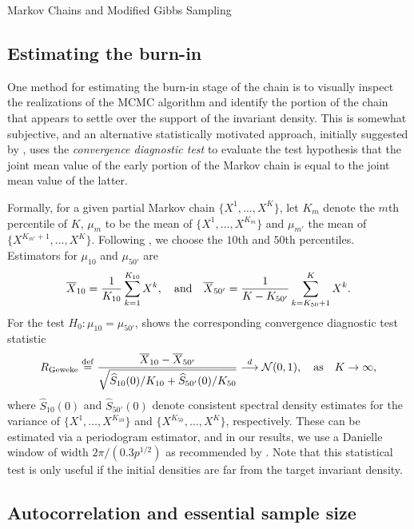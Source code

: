 \begin{chapter}{Markov Chains and Modified Gibbs Sampling}
\subsection{Estimating the burn-in}

One method for estimating the burn-in stage of the chain is to visually inspect the realizations of the MCMC algorithm and identify the portion of the chain that appears to settle over the support of the invariant density.
This is somewhat subjective, and an alternative statistically motivated approach, initially suggested by \citep{geweke1991evaluating}, uses the \emph{convergence diagnostic test} to evaluate the test hypothesis that the joint mean value of the early portion of the Markov chain is equal to the joint mean value of the latter. 

Formally, for a given partial Markov chain $\{X^1,\dots, X^K\}$, let $K_m$ denote the $m$th percentile of $K$, $\mu_m$ to be the mean of $\{X^1,\dots, X^{K_m}\}$ and $\mu_{m'}$ the mean of $\{X^{K_{m'}+1},\dots, X^K\}$.
Following \citep{geweke1991evaluating}, we choose the $10$th and $50$th percentiles.
Estimators for $\mu_{10}$ and $\mu_{50'}$ are
\begin{equation}
  \bar X_{10}=\frac{1}{K_{10}}\sum_{k=1}^{K_{10}}X^k,\quad{\rm and}\quad\bar X_{50'}=\frac{1}{K-K_{50'}}\sum_{k=K_{50}+1}^K X^k.
\end{equation}
For the test $H_0:\mu_{10} = \mu_{50'}$, \citep{geweke1991evaluating} shows the corresponding convergence diagnostic test statistic 
\begin{equation}
\label{Geweke}
R_{\rm Geweke}\eqdef\frac{\bar X_{10}-\bar X_{50'}}{\sqrt{\hat S_{10}(0)/K_{10}+\hat S_{50'}(0)/K_{50}}}\stackrel{d}{\longrightarrow}\N(0,1),\quad{\rm as}\quad K\rightarrow\infty,
\end{equation}
where $\hat S_{10}(0)$ and $\hat S_{50'}(0)$ denote consistent spectral density estimates for the variance of $\{X^1,\dots, X^{K_{10}}\}$ and $\{X^{K_{50}},\dots, X^K\}$, respectively. 
These can be estimated via a periodogram estimator, and in our results, we use a Danielle window of width $2\pi/(0.3p^{1/2})$ as recommended by \citep{geweke1991evaluating}.
Note that this statistical test is only useful if the initial densities are far from the target invariant density.

\subsection{Autocorrelation and essential sample size}


\end{chapter}
